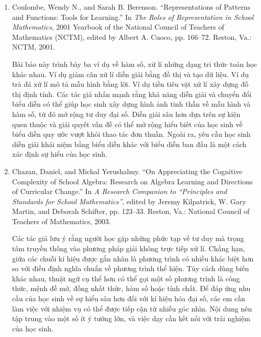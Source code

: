 {{\begin{enumerate}
        \item Coulombe, Wendy N., and Sarah B. Berenson. ``Representations of Patterns and Functions: Tools for Learning.'' In \emph{The Roles of Representation in School Mathematics}, 2001 Yearbook of the National Council of Teachers of Mathematics (NCTM), edited by Albert A. Cuoco, pp. 166--72. Reston, Va.: NCTM, 2001.\vspace{.25\baselineskip}

          \par\noindent\hspace*{1em} Bài báo này trình bày ba ví dụ về hàm số, xử lí những dạng tri thức toán học khác nhau. Ví dụ giảm cân xử lí diễn giải bằng đồ thị và tạo dữ liệu. Ví dụ trà đá xử lí mô tả mẫu hình bằng lời. Ví dụ tiền tiêu vặt xử lí xây dựng đồ thị định tính. Các tác giả nhấn mạnh rằng khả năng diễn giải và chuyển đổi biểu diễn có thể giúp học sinh xây dựng hình ảnh tinh thần về mẫu hình và hàm số, từ đó mở rộng tư duy đại số. Diễn giải sâu hơn dựa trên sự kiện quen thuộc và giải quyết vấn đề có thể mở rộng hiểu biết của học sinh về biểu diễn quy ước vượt khỏi thao tác đơn thuần. Ngoài ra, yêu cầu học sinh diễn giải khái niệm bằng biểu diễn khác với biểu diễn ban đầu là một cách xác định sự hiểu của học sinh.\vspace{5.35\baselineskip}

        \item Chazan, Daniel, and Michal Yerushalmy. “On Appreciating the Cognitive Complexity of School Algebra: Research on Algebra Learning and Directions of Curricular Change.” In \emph{A Research Companion to ``Principles and Standards for School Mathematics''}, edited by Jeremy Kilpatrick, W. Gary Martin, and Deborah Schifter, pp. 123--33. Reston, Va.: National Council of Teachers of Mathematics, 2003.\vspace{.25\baselineskip}

          \par\noindent\hspace*{1em} Các tác giả lưu ý rằng người học gặp những phức tạp về tư duy mà trọng tâm truyền thống vào phương pháp giải không trực tiếp xử lí. Chẳng hạn, giữa các chuỗi kí hiệu được gắn nhãn là phương trình có nhiều khác biệt hơn so với điều định nghĩa chuẩn về phương trình thể hiện. Tùy cách dùng biến khác nhau, thuật ngữ cụ thể hơn có thể gọi một số phương trình là công thức, mệnh đề mở, đồng nhất thức, hàm số hoặc tính chất. Để đáp ứng nhu cầu của học sinh về sự hiểu sâu hơn đối với kí hiệu hóa đại số, các em cần làm việc với nhiệm vụ có thể được tiếp cận từ nhiều góc nhìn. Nội dung nên tập trung vào một số ít ý tưởng lớn, và việc dạy cần kết nối với trải nghiệm của học sinh.
      \end{enumerate}}
  }{\NOTE{}}


